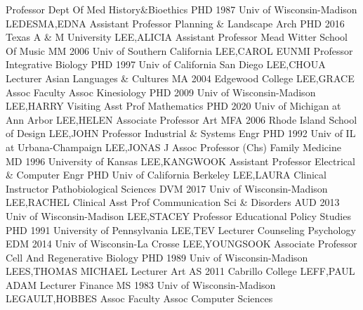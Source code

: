 \documentclass[
]{article}
\begin{document}
 \textbar Professor \textbar Dept Of Med History\&Bioethics
\textbar PHD 1987 Univ of Wisconsin-Madison \textbar LEDESMA,EDNA
\textbar{}  \textbar Assistant Professor \textbar Planning
\& Landscape Arch \textbar PHD 2016 Texas A \& M University
\textbar LEE,ALICIA \textbar{}  \textbar Assistant Professor
\textbar Mead Witter School Of Music \textbar MM 2006 Univ of Southern
California \textbar LEE,CAROL EUNMI \textbar{} 
\textbar Professor \textbar Integrative Biology \textbar PHD 1997 Univ
of California San Diego \textbar LEE,CHOUA \textbar{} 
\textbar Lecturer \textbar Asian Languages \& Cultures \textbar MA 2004
Edgewood College \textbar LEE,GRACE \textbar{} 
\textbar Assoc Faculty Assoc \textbar Kinesiology \textbar PHD 2009 Univ
of Wisconsin-Madison \textbar LEE,HARRY \textbar{} 
\textbar Visiting Asst Prof \textbar Mathematics \textbar PHD 2020 Univ
of Michigan at Ann Arbor \textbar LEE,HELEN \textbar{} 
\textbar Associate Professor \textbar Art \textbar MFA 2006 Rhode Island
School of Design \textbar LEE,JOHN \textbar{} 
\textbar Professor \textbar Industrial \& Systems Engr \textbar PHD 1992
Univ of IL at Urbana-Champaign \textbar LEE,JONAS J \textbar{}
 \textbar Assoc Professor (Chs) \textbar Family Medicine
\textbar MD 1996 University of Kansas \textbar LEE,KANGWOOK \textbar{}
 \textbar Assistant Professor \textbar Electrical \&
Computer Engr \textbar PHD Univ of California Berkeley
\textbar LEE,LAURA \textbar{}  \textbar Clinical Instructor
\textbar Pathobiological Sciences \textbar DVM 2017 Univ of
Wisconsin-Madison \textbar LEE,RACHEL \textbar{} 
\textbar Clinical Asst Prof \textbar Communication Sci \& Disorders
\textbar AUD 2013 Univ of Wisconsin-Madison \textbar LEE,STACEY
\textbar{}  \textbar Professor \textbar Educational Policy
Studies \textbar PHD 1991 University of Pennsylvania \textbar LEE,TEV
\textbar{}  \textbar Lecturer \textbar Counseling Psychology
\textbar EDM 2014 Univ of Wisconsin-La Crosse \textbar LEE,YOUNGSOOK
\textbar{}  \textbar Associate Professor \textbar Cell And
Regenerative Biology \textbar PHD 1989 Univ of Wisconsin-Madison
\textbar LEES,THOMAS MICHAEL \textbar{}  \textbar Lecturer
\textbar Art \textbar AS 2011 Cabrillo College \textbar LEFF,PAUL ADAM
\textbar{}  \textbar Lecturer \textbar Finance \textbar MS
1983 Univ of Wisconsin-Madison \textbar LEGAULT,HOBBES \textbar{}
 \textbar Assoc Faculty Assoc \textbar Computer Sciences
\end{document}
